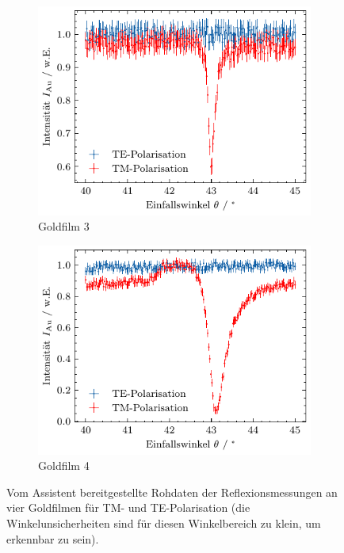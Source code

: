\begin{figure}[H]
\begin{subfigure}{0.4\textwidth}
        \includegraphics[width=\linewidth]{../figs/au3}
        \caption{Goldfilm 3}
    \end{subfigure}
    \begin{subfigure}{0.4\textwidth}
        \centering
        \includegraphics[width=\linewidth]{../figs/au4}
        \caption{Goldfilm 4}
    \end{subfigure}
    \caption{Vom Assistent bereitgestellte Rohdaten der Reflexionsmessungen an vier Goldfilmen für TM- und TE-Polarisation (die Winkelunsicherheiten sind für diesen Winkelbereich zu klein, um erkennbar zu sein).}\label{fig:gold}
\end{figure}